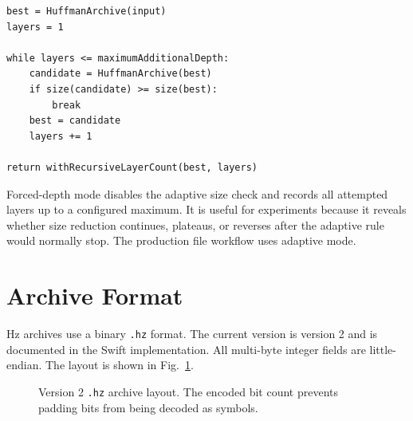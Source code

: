 \documentclass[conference]{IEEEtran}
\begin{document}
\begin{lstlisting}[language={},caption={Adaptive recursive compression.},label={alg:adaptive},basicstyle=\ttfamily\footnotesize,frame=single]
best = HuffmanArchive(input)
layers = 1

while layers <= maximumAdditionalDepth:
    candidate = HuffmanArchive(best)
    if size(candidate) >= size(best):
        break
    best = candidate
    layers += 1

return withRecursiveLayerCount(best, layers)
\end{lstlisting}

Forced-depth mode disables the adaptive size check and records all attempted layers up to a configured maximum. It is useful for experiments because it reveals whether size reduction continues, plateaus, or reverses after the adaptive rule would normally stop. The production file workflow uses adaptive mode.

\section{Archive Format}

Hz archives use a binary \texttt{.hz} format. The current version is version 2 and is documented in the Swift implementation. All multi-byte integer fields are little-endian. The layout is shown in Fig.~\ref{fig:archive-layout}.

\begin{figure}[t]
\centering
{}
\caption{Version 2 \texttt{.hz} archive layout. The encoded bit count prevents padding bits from being decoded as symbols.}
\label{fig:archive-layout}
\end{figure}
\end{document}

